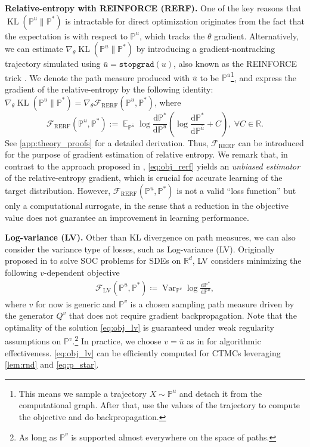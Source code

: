 \documentclass{article}
\theoremstyle{remark}
\newcommand{\ro}[1]{\left(#1\right)} %
\renewcommand{\P}{\mathbb{P}}
\newcommand{\E}{\operatorname{\mathbb{E}}}
\newcommand{\var}{\operatorname{Var}}
\newcommand{\R}{\mathbb{R}}
\newcommand{\stopgrad}[1]{\texttt{stopgrad}\left(#1\right)}
\newcommand{\de}[2]{\frac{\mathrm{d}#1}{\mathrm{d}#2}} %
\newcommand{\kl}{\operatorname{KL}}
\newcommand{\cF}{\mathcal{F}}
\newcommand{\ub}{{\bar{u}}}
\begin{document}
\textbf{Relative-entropy with REINFORCE (RERF).} One of the key reasons that $\kl(\P^u\|\P^*)$ is intractable for direct optimization originates from the fact that the expectation is with respect to $\P^u$, which tracks the $\theta$ gradient. Alternatively, we can estimate $\nabla_{\theta} \kl(\P^u \| \P^*)$ by introducing a gradient-nontracking trajectory simulated using $\ub = \stopgrad{u}$, also known as the REINFORCE trick \cite{williams1992simple,ranganath2014black,mnih2014neural}. We denote the path measure produced with $\ub$ to be $\P^{\ub}$\footnote{This means we sample a trajectory $X\sim\P^u$ and detach it from the computational graph. After that, use the values of the trajectory to compute the objective and do backpropagation.}, and express the gradient of the relative-entropy by the following identity: $\nabla_\theta\kl(\P^u\|\P^*)=\nabla_\theta\cF_{\mathrm{RERF}}(\P^u, \P^*)$, where
\begin{equation}
\cF_{\mathrm{RERF}}(\P^u, \P^*):=\E_{\P^\ub}\log\de{\P^*}{\P^u}\ro{\log\de{\P^*}{\P^\ub}+C},~\forall C\in\R.
\label{eq:obj_rerf}
\end{equation}
See \cref{app:theory_proofs} for a detailed derivation. Thus, $\cF_{\mathrm{RERF}}$ can be introduced for the purpose of gradient estimation of relative entropy. We remark that, in contrast to the approach proposed in \cite{wang2025finetuning}, \cref{eq:obj_rerf} yields an \textit{unbiased estimator} of the relative-entropy gradient, which is crucial for accurate learning of the target distribution. However, $\cF_{\mathrm{RERF}}(\P^u, \P^*)$
%
is not a valid ``loss function'' but only a computational surrogate, in the sense that a reduction in the objective value does not guarantee an improvement in learning performance.

\textbf{Log-variance (LV).} Other than KL divergence on path measures, we can also consider the variance type of losses, such as Log-variance (LV). Originally proposed in \cite{nusken2021solving} to solve SOC problems for SDEs on $\mathbb{R}^d$, LV considers minimizing the following $v$-dependent objective
\begin{align}
\cF_{\mathrm{LV}}(\P^u, \P^*) \coloneqq \var_{\P^v}\log\de{\P^*}{\P^u},
\label{eq:obj_lv}
\end{align}
%
where $v$ for now is generic and $\P^v$ is a chosen sampling path measure driven by the generator $Q^v$ that does not require gradient backpropagation. 
%
Note that the optimality of the solution \cref{eq:obj_lv} is guaranteed under weak regularity assumptions on $\P^v$.\footnote{As long as $\P^v$ is supported almost everywhere on the space of paths.} In practice, we choose $v = \ub$ as in \cite{nusken2021solving} for algorithmic effectiveness. \cref{eq:obj_lv} can be efficiently computed for CTMCs leveraging \cref{lem:rnd} and \cref{eq:p_star}.
\end{document}
